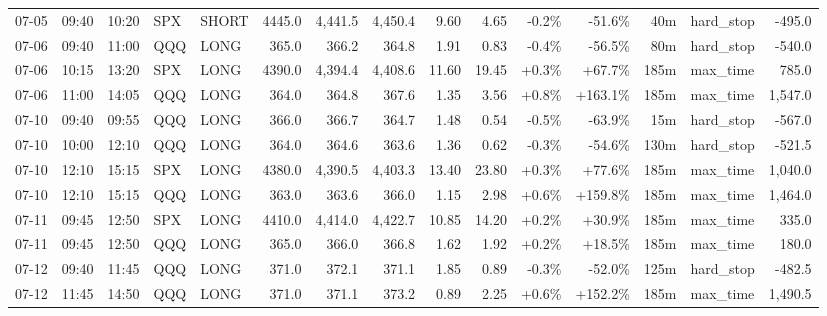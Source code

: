 \documentclass[11pt,a4paper,twoside]{article}
\begin{document}
\begin{landscape}
\begin{center}
\begin{longtable}{>{\color{txtmain}}l l l l l r r r r r r r r >{\color{txtmain}}l r}
07-05 & 09:40 & 10:20 & SPX & SHORT & 4445.0 & 4,441.5 & 4,450.4 & 9.60 & 4.65 & \textcolor{lossred}{-0.2\%} & \textcolor{lossred}{-51.6\%} & 40m & hard\_stop & \textcolor{lossred}{-495.0} \\
07-06 & 09:40 & 11:00 & QQQ & LONG & 365.0 & 366.2 & 364.8 & 1.91 & 0.83 & \textcolor{lossred}{-0.4\%} & \textcolor{lossred}{-56.5\%} & 80m & hard\_stop & \textcolor{lossred}{-540.0} \\
07-06 & 10:15 & 13:20 & SPX & LONG & 4390.0 & 4,394.4 & 4,408.6 & 11.60 & 19.45 & \textcolor{wingreen}{+0.3\%} & \textcolor{wingreen}{+67.7\%} & 185m & max\_time & \textcolor{wingreen}{785.0} \\
07-06 & 11:00 & 14:05 & QQQ & LONG & 364.0 & 364.8 & 367.6 & 1.35 & 3.56 & \textcolor{wingreen}{+0.8\%} & \textcolor{wingreen}{+163.1\%} & 185m & max\_time & \textcolor{wingreen}{1,547.0} \\
07-10 & 09:40 & 09:55 & QQQ & LONG & 366.0 & 366.7 & 364.7 & 1.48 & 0.54 & \textcolor{lossred}{-0.5\%} & \textcolor{lossred}{-63.9\%} & 15m & hard\_stop & \textcolor{lossred}{-567.0} \\
07-10 & 10:00 & 12:10 & QQQ & LONG & 364.0 & 364.6 & 363.6 & 1.36 & 0.62 & \textcolor{lossred}{-0.3\%} & \textcolor{lossred}{-54.6\%} & 130m & hard\_stop & \textcolor{lossred}{-521.5} \\
07-10 & 12:10 & 15:15 & SPX & LONG & 4380.0 & 4,390.5 & 4,403.3 & 13.40 & 23.80 & \textcolor{wingreen}{+0.3\%} & \textcolor{wingreen}{+77.6\%} & 185m & max\_time & \textcolor{wingreen}{1,040.0} \\
07-10 & 12:10 & 15:15 & QQQ & LONG & 363.0 & 363.6 & 366.0 & 1.15 & 2.98 & \textcolor{wingreen}{+0.6\%} & \textcolor{wingreen}{+159.8\%} & 185m & max\_time & \textcolor{wingreen}{1,464.0} \\
07-11 & 09:45 & 12:50 & SPX & LONG & 4410.0 & 4,414.0 & 4,422.7 & 10.85 & 14.20 & \textcolor{wingreen}{+0.2\%} & \textcolor{wingreen}{+30.9\%} & 185m & max\_time & \textcolor{wingreen}{335.0} \\
07-11 & 09:45 & 12:50 & QQQ & LONG & 365.0 & 366.0 & 366.8 & 1.62 & 1.92 & \textcolor{wingreen}{+0.2\%} & \textcolor{wingreen}{+18.5\%} & 185m & max\_time & \textcolor{wingreen}{180.0} \\
07-12 & 09:40 & 11:45 & QQQ & LONG & 371.0 & 372.1 & 371.1 & 1.85 & 0.89 & \textcolor{lossred}{-0.3\%} & \textcolor{lossred}{-52.0\%} & 125m & hard\_stop & \textcolor{lossred}{-482.5} \\
07-12 & 11:45 & 14:50 & QQQ & LONG & 371.0 & 371.1 & 373.2 & 0.89 & 2.25 & \textcolor{wingreen}{+0.6\%} & \textcolor{wingreen}{+152.2\%} & 185m & max\_time & \textcolor{wingreen}{1,490.5} \\

\end{longtable}
\end{center}
\end{landscape}
\end{document}
